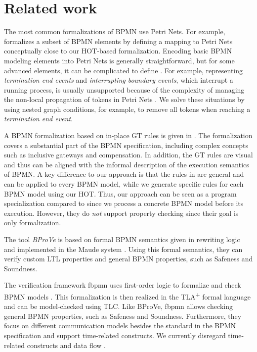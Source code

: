 \documentclass{lmcs} %
\begin{document}
\section{Related work} \label{sec:relatedWork}
The most common formalizations of BPMN use Petri Nets.
For example, \cite{dijkmanSemanticsAnalysisBusiness2008} formalizes a subset of BPMN elements by defining a mapping to Petri Nets conceptually close to our HOT-based formalization.
Encoding basic BPMN modeling elements into Petri Nets is generally straightforward, but for some advanced elements, it can be complicated to define \cite{hofstedeWorkflowPatternsExpressive2002}.
For example, representing \textit{termination end events} and \textit{interrupting boundary events}, which interrupt a running process, is usually unsupported because of the complexity of managing the non-local propagation of tokens in Petri Nets \cite{corradiniFormalApproachAnalysis2021}.
We solve these situations by using nested graph conditions, for example, to remove all tokens when reaching a \textit{termination end event}.
 
A BPMN formalization based on in-place GT rules is given in \cite{vangorpVisualTokenbasedFormalization2013}.
The formalization covers a substantial part of the BPMN specification, including complex concepts such as inclusive gateways and compensation.
In addition, the GT rules are visual and thus can be aligned with the informal description of the execution semantics of BPMN.
A key difference to our approach is that the rules in \cite{vangorpVisualTokenbasedFormalization2013} are general and can be applied to every BPMN model, while we generate specific rules for each BPMN model using our HOT.
Thus, our approach can be seen as a program specialization compared to \cite{vangorpVisualTokenbasedFormalization2013} since we process a concrete BPMN model before its execution.
However, they do \textit{not} support property checking since their goal is only formalization.

The tool \textit{BProVe} is based on formal BPMN semantics given in rewriting logic and implemented in the Maude system \cite{corradiniFormalApproachAnalysis2021}.
Using this formal semantics, they can verify custom LTL properties and general BPMN properties, such as Safeness and Soundness.

The verification framework \textsf{fbpmn} uses first-order logic to formalize and check BPMN models \cite{houhouFirstOrderLogicVerification2022}.
This formalization is then realized in the TLA\textsuperscript{+} formal language and can be model-checked using TLC.
Like BProVe, \textsf{fbpmn} allows checking general BPMN properties, such as Safeness and Soundness.
Furthermore, they focus on different communication models besides the standard in the BPMN specification and support time-related constructs.
We currently disregard time-related constructs \cite{duranVerifyingTimedBPMN2017,houhouFirstOrderLogicVerification2022} and data flow \cite{corradiniFormalisingAnimatingMultiple2022,el-saberCMMICMComplianceChecking2015}.
\end{document}
